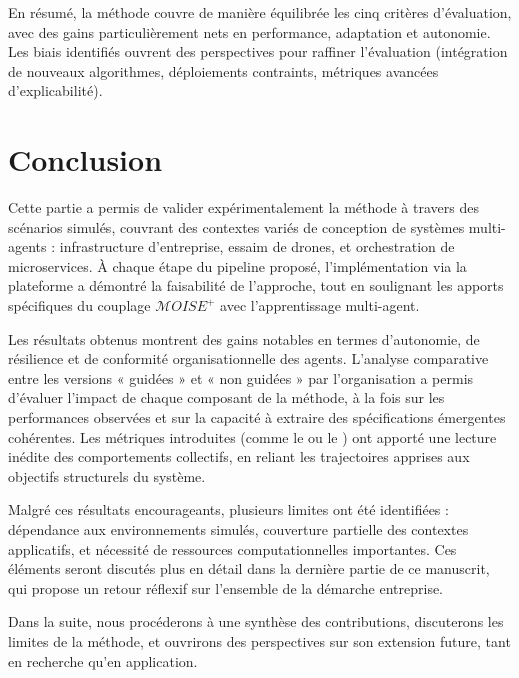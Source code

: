 \medskip
En résumé, la méthode  couvre de manière équilibrée les cinq critères d'évaluation, avec des gains particulièrement nets en performance, adaptation et autonomie. Les biais identifiés ouvrent des perspectives pour raffiner l'évaluation (intégration de nouveaux algorithmes, déploiements contraints, métriques avancées d'explicabilité).

\clearpage
\thispagestyle{empty}
\null
\newpage


\chapter*{Conclusion}

Cette partie a permis de valider expérimentalement la méthode  à travers des scénarios simulés, couvrant des contextes variés de conception de systèmes multi-agents : infrastructure d'entreprise, essaim de drones, et orchestration de microservices. À chaque étape du pipeline proposé, l'implémentation via la plateforme  a démontré la faisabilité de l'approche, tout en soulignant les apports spécifiques du couplage $\mathcal{M}OISE^+$ avec l'apprentissage multi-agent.

Les résultats obtenus montrent des gains notables en termes d'autonomie, de résilience et de conformité organisationnelle des agents. L'analyse comparative entre les versions « guidées » et « non guidées » par l'organisation a permis d'évaluer l'impact de chaque composant de la méthode, à la fois sur les performances observées et sur la capacité à extraire des spécifications émergentes cohérentes. Les métriques introduites (comme le  ou le ) ont apporté une lecture inédite des comportements collectifs, en reliant les trajectoires apprises aux objectifs structurels du système.

Malgré ces résultats encourageants, plusieurs limites ont été identifiées : dépendance aux environnements simulés, couverture partielle des contextes applicatifs, et nécessité de ressources computationnelles importantes. Ces éléments seront discutés plus en détail dans la dernière partie de ce manuscrit, qui propose un retour réflexif sur l'ensemble de la démarche entreprise.

\vspace{1em}

\noindent
Dans la suite, nous procéderons à une synthèse des contributions, discuterons les limites de la méthode, et ouvrirons des perspectives sur son extension future, tant en recherche qu'en application.
